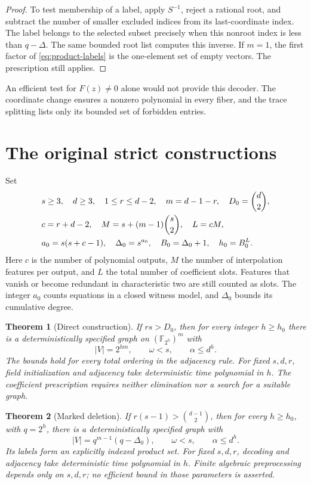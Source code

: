 \documentclass[11pt,a4paper]{article}
\newcommand{\F}{\mathbb F}
\newtheorem{theorem}{Theorem}[section]
\theoremstyle{definition}
\theoremstyle{remark}
\numberwithin{equation}{section}
\begin{document}
\begin{proof}
To test membership of a label, apply $S^{-1}$, reject a rational root, and subtract the number of smaller excluded indices from its last-coordinate index. The label belongs to the selected subset precisely when this nonroot index is less than $q-\Delta$. The same bounded root list computes this inverse. If $m=1$, the first factor of \eqref{eq:product-labels} is the one-element set of empty vectors. The prescription still applies.
\end{proof}


An efficient test for $F(z)\ne0$ alone would not provide this decoder. The coordinate change ensures a nonzero polynomial in every fiber, and the trace splitting lists only its bounded set of forbidden entries.

\section{The original strict constructions}\label{sec:original-statements}

Set
\begin{align}\label{eq:original-parameters}
&s\ge3,\quad d\ge3,\quad 1\le r\le d-2,\quad m=d-1-r,\quad D_0=\binom d2,\notag\\
&c=r+d-2,\quad M=s+(m-1)\binom s2,\quad L=cM,\notag\\
&a_0=s(s+c-1),\quad \Delta_0=s^{a_0},\quad B_0=\Delta_0+1,\quad h_0=B_0^L.
\end{align}
Here $c$ is the number of polynomial outputs, $M$ the number of interpolation features per output, and $L$ the total number of coefficient slots. Features that vanish or become redundant in characteristic two are still counted as slots. The integer $a_0$ counts equations in a closed witness model, and $\Delta_0$ bounds its cumulative degree.

\begin{theorem}[Direct construction]\label{thm:direct}
If $rs>D_0$, then for every integer $h\ge h_0$ there is a deterministically specified graph on $(\F_{2^h})^m$ with
\[
|V|=2^{hm},\qquad \omega<s,\qquad \alpha\le d^h.
\]
The bounds hold for every total ordering in the adjacency rule. For fixed $s,d,r$, field initialization and adjacency take deterministic time polynomial in $h$. The coefficient prescription requires neither elimination nor a search for a suitable graph.
\end{theorem}

\begin{theorem}[Marked deletion]\label{thm:marked}
If $r(s-1)>\binom{d-1}2$, then for every $h\ge h_0$, with $q=2^h$, there is a deterministically specified graph with
\[
|V|=q^{m-1}(q-\Delta_0),\qquad \omega<s,\qquad \alpha\le d^h.
\]
Its labels form an explicitly indexed product set. For fixed $s,d,r$, decoding and adjacency take deterministic time polynomial in $h$. Finite algebraic preprocessing depends only on $s,d,r$; no efficient bound in those parameters is asserted.
\end{theorem}
\end{document}
